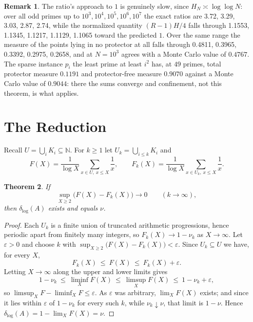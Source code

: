 \documentclass[11pt]{article}
\theoremstyle{plain}
\newtheorem{theorem}{Theorem}[section]
\theoremstyle{definition}
\newtheorem{remark}[theorem]{Remark}
\newcommand{\N}{\mathbb{N}}
\newcommand{\dlog}{\delta_{\log}}
\begin{document}
\begin{remark}
The ratio's approach to $1$ is genuinely slow, since
$H_N\asymp\log\log N$: over all odd primes up to
$10^3,10^4,10^5,10^6,10^7$ the exact ratios are 3.72, 3.29, 3.03, 2.87, 2.74, while the
normalized quantity $(R-1)H/4$ falls through 1.1553, 1.1345, 1.1217, 1.1129, 1.1065 toward the
predicted $1$.  Over the same range the measure of the points
lying in no protector at all falls through 0.4811, 0.3965, 0.3392, 0.2975, 0.2658, and at $N=10^3$
agrees with a Monte Carlo value of $0.4767$.  The sparse
instance $p_i$ the least prime at least $i^2$ has, at $49$
primes, total protector measure $0.1191$ and protector-free
measure $0.9070$ against a Monte Carlo value of $0.9044$: there the sums
converge and confinement, not this theorem, is what applies.
\end{remark}

\section{The Reduction}\label{sec:reduction}

Recall $U=\bigcup_i K_i\subseteq\N$.  For $k\ge1$ let
$U_k=\bigcup_{i\le k}K_i$ and
\[
  F(X)=\frac{1}{\log X}\sum_{x\in U,\ x\le X}\frac1x,
  \qquad
  F_k(X)=\frac{1}{\log X}\sum_{x\in U_k,\ x\le X}\frac1x .
\]

\begin{theorem}\label{thm:reduction}
If
\[
  \sup_{X\ge2}\bigl(F(X)-F_k(X)\bigr)\longrightarrow 0
  \qquad (k\to\infty),
\]
then $\dlog(A)$ exists and equals $\nu$.
\end{theorem}

\begin{proof}
Each $U_k$ is a finite union of truncated arithmetic
progressions, hence periodic apart from finitely many integers,
so $F_k(X)\to 1-\nu_k$ as $X\to\infty$.  Let $\varepsilon>0$ and
choose $k$ with $\sup_{X\ge2}\bigl(F(X)-F_k(X)\bigr)<\varepsilon$.
Since $U_k\subseteq U$ we have, for every $X$,
\[
  F_k(X)\ \le\ F(X)\ \le\ F_k(X)+\varepsilon .
\]
Letting $X\to\infty$ along the upper and lower limits gives
\[
  1-\nu_k\ \le\ \liminf_X F(X)
  \ \le\ \limsup_X F(X)\ \le\ 1-\nu_k+\varepsilon,
\]
so $\limsup_X F-\liminf_X F\le\varepsilon$.  As $\varepsilon$
was arbitrary, $\lim_X F(X)$ exists; and since it lies within
$\varepsilon$ of $1-\nu_k$ for every such $k$, while
$\nu_k\downarrow\nu$, that limit is $1-\nu$.  Hence
$\dlog(A)=1-\lim_X F(X)=\nu$.
\end{proof}
\end{document}

